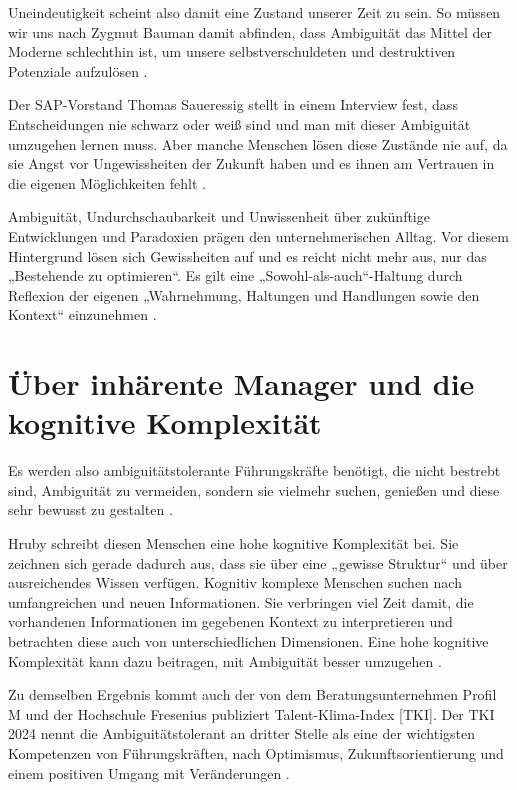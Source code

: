 \documentclass[
  ngerman,
  letterpaper,
  DIV=11]{scrartcl}
\begin{document}
Uneindeutigkeit scheint also damit eine Zustand unserer Zeit zu sein. So
müssen wir uns nach Zygmut Bauman damit abfinden, dass Ambiguität das
Mittel der Moderne schlechthin ist, um unsere selbstverschuldeten und
destruktiven Potenziale aufzulösen \autocite{bauman2016}.

Der SAP-Vorstand Thomas Saueressig stellt in einem Interview fest, dass
Entscheidungen nie schwarz oder weiß sind und man mit dieser Ambiguität
umzugehen lernen muss. \autocite{witte2024} Aber manche Menschen lösen
diese Zustände nie auf, da sie Angst vor Ungewissheiten der Zukunft
haben und es ihnen am Vertrauen in die eigenen Möglichkeiten fehlt
\autocite[15]{morschitzky2009}.

Ambiguität, Undurchschaubarkeit und Unwissenheit über zukünftige
Entwicklungen und Paradoxien prägen den unternehmerischen Alltag. Vor
diesem Hintergrund lösen sich Gewissheiten auf und es reicht nicht mehr
aus, nur das „Bestehende zu optimieren``. Es gilt eine
„Sowohl-als-auch``-Haltung durch Reflexion der eigenen „Wahrnehmung,
Haltungen und Handlungen sowie den Kontext`` einzunehmen
\autocite{kozica2025}.

\section{Über inhärente Manager und die kognitive
Komplexität}\label{uxfcber-inhuxe4rente-manager-und-die-kognitive-komplexituxe4t}

Es werden also ambiguitätstolerante Führungskräfte benötigt, die nicht
bestrebt sind, Ambiguität zu vermeiden, sondern sie vielmehr suchen,
genießen und diese sehr bewusst zu gestalten \autocite[90]{bauer2018}.

Hruby schreibt diesen Menschen eine hohe kognitive Komplexität bei. Sie
zeichnen sich gerade dadurch aus, dass sie über eine „gewisse Struktur``
und über ausreichendes Wissen verfügen. Kognitiv komplexe Menschen
suchen nach umfangreichen und neuen Informationen. Sie verbringen viel
Zeit damit, die vorhandenen Informationen im gegebenen Kontext zu
interpretieren und betrachten diese auch von unterschiedlichen
Dimensionen. Eine hohe kognitive Komplexität kann dazu beitragen, mit
Ambiguität besser umzugehen \autocite[5]{hruby2014}.

Zu demselben Ergebnis kommt auch der von dem Beratungsunternehmen Profil
M und der Hochschule Fresenius publiziert Talent-Klima-Index {[}TKI{]}.
Der TKI 2024 nennt die Ambiguitätstolerant an dritter Stelle als eine
der wichtigsten Kompetenzen von Führungskräften, nach Optimismus,
Zukunftsorientierung und einem positiven Umgang mit Veränderungen
\autocite{stulle2024}.
\end{document}
